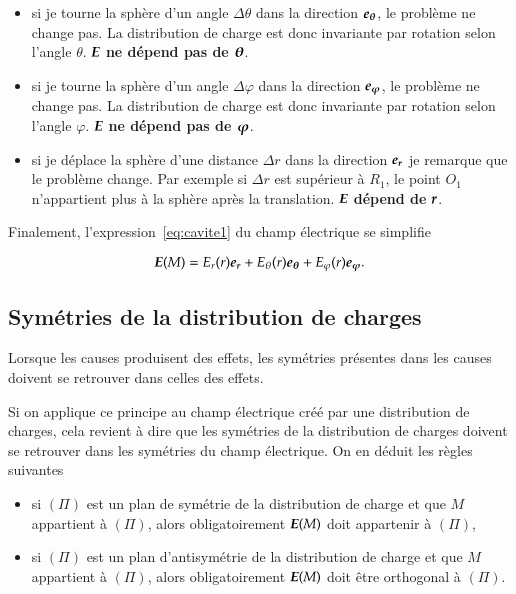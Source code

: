 \begin{itemize}
	\item  si je tourne la sphère d'un angle $\Delta \theta$ dans la
	  direction $\etheta$, le problème
	  ne change pas. La distribution de charge est donc invariante 
	  par rotation selon l'angle $\theta$. $\vece$ \textbf{ne dépend pas de
	  $\mitbf{\theta}$}.

	  \item  si je tourne la sphère d'un angle $\Delta \varphi$ dans la
	  direction $\ephi$, le problème
	  ne change pas. La distribution de charge est donc invariante 
	  par rotation selon l'angle $\varphi$. $\vece$ \textbf{ne dépend pas de
	  $\mitbf{\varphi}$}.
  	\item si je déplace la sphère d'une distance $\Delta r$ dans la direction
	$\er$ je remarque que le problème change. Par exemple si $\Delta r$ 
	est supérieur à $R_1$, le point $O_1$ n'appartient plus à la sphère après
	la translation. $\vece$ \textbf{dépend de} $\mitbf{r}$.

\end{itemize}

Finalement, l'expression~\ref{eq:cavite1} du champ électrique se simplifie

\begin{equation}
	\vece(M) = E_r(r)\er + E_\theta(r)\etheta + E_\varphi(r)\ephi.
\end{equation}
\subsection{Symétries de la distribution de charges}

\begin{defn}
	Lorsque les causes produisent des effets, les symétries présentes dans les
	causes doivent se retrouver dans celles des effets.
\end{defn}

Si on applique ce principe au champ électrique créé par une distribution 
de charges, cela revient à dire que les symétries de la distribution de 
charges doivent se retrouver dans les symétries du champ électrique. On en 
déduit les règles suivantes

\begin{defn}
  \begin{itemize}
  \item si $(\Pi)$ est un plan de symétrie de la distribution de charge et que 
    $M$ appartient à $(\Pi)$, alors obligatoirement $\vece(M)$ doit 
    appartenir à $(\Pi)$,
  \item si $(\Pi)$ est un plan d'antisymétrie de la distribution de charge 
    et que $M$ appartient à $(\Pi)$, alors obligatoirement $\vece(M)$ doit 
    être orthogonal à $(\Pi)$.
  \end{itemize}
\end{defn}

